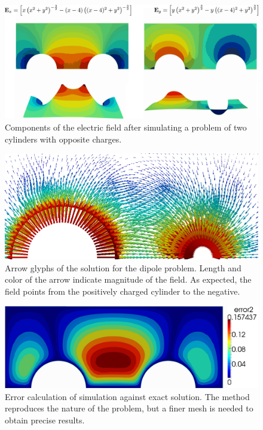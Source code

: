 \begin{figure}
\centering
\includegraphics[scale=0.2]{./img/two_cylinders.pdf}
\caption{Components of the electric field after simulating a problem of two cylinders with opposite charges.}
\label{fig:two_cylinders}
\end{figure}

\begin{figure}
\centering
\includegraphics[scale=0.5]{./img/two_cylinders_Gliphs}
\caption{Arrow glyphs of the solution for the dipole problem. Length and color of the arrow indicate magnitude of the field. As expected, the field points from the positively charged cylinder to the negative.}
\label{fig:two_cylinders_glyph}
\end{figure}

\begin{figure}
\centering
\includegraphics[scale=0.4]{./img/two_cylinders_error.pdf}
\caption{Error calculation of simulation against exact solution. The method reproduces the nature of the problem, but a finer mesh is needed to obtain precise results.}
\label{fig:two_cylinders_error}
\end{figure}

